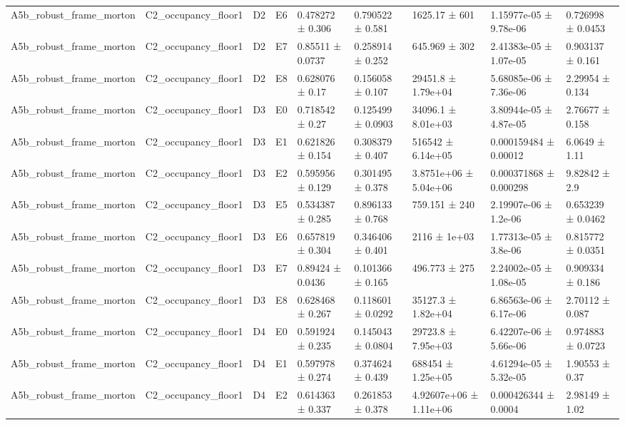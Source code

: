\begin{table}
\begin{tabular}{lllllllll}
A5b\_robust\_frame\_morton & C2\_occupancy\_floor1 & D2 & E6 & 0.478272 ± 0.306 & 0.790522 ± 0.581 & 1625.17 ± 601 & 1.15977e-05 ± 9.78e-06 & 0.726998 ± 0.0453 \\
A5b\_robust\_frame\_morton & C2\_occupancy\_floor1 & D2 & E7 & 0.85511 ± 0.0737 & 0.258914 ± 0.252 & 645.969 ± 302 & 2.41383e-05 ± 1.07e-05 & 0.903137 ± 0.161 \\
A5b\_robust\_frame\_morton & C2\_occupancy\_floor1 & D2 & E8 & 0.628076 ± 0.17 & 0.156058 ± 0.107 & 29451.8 ± 1.79e+04 & 5.68085e-06 ± 7.36e-06 & 2.29954 ± 0.134 \\
A5b\_robust\_frame\_morton & C2\_occupancy\_floor1 & D3 & E0 & 0.718542 ± 0.27 & 0.125499 ± 0.0903 & 34096.1 ± 8.01e+03 & 3.80944e-05 ± 4.87e-05 & 2.76677 ± 0.158 \\
A5b\_robust\_frame\_morton & C2\_occupancy\_floor1 & D3 & E1 & 0.621826 ± 0.154 & 0.308379 ± 0.407 & 516542 ± 6.14e+05 & 0.000159484 ± 0.00012 & 6.0649 ± 1.11 \\
A5b\_robust\_frame\_morton & C2\_occupancy\_floor1 & D3 & E2 & 0.595956 ± 0.129 & 0.301495 ± 0.378 & 3.8751e+06 ± 5.04e+06 & 0.000371868 ± 0.000298 & 9.82842 ± 2.9 \\
A5b\_robust\_frame\_morton & C2\_occupancy\_floor1 & D3 & E5 & 0.534387 ± 0.285 & 0.896133 ± 0.768 & 759.151 ± 240 & 2.19907e-06 ± 1.2e-06 & 0.653239 ± 0.0462 \\
A5b\_robust\_frame\_morton & C2\_occupancy\_floor1 & D3 & E6 & 0.657819 ± 0.304 & 0.346406 ± 0.401 & 2116 ± 1e+03 & 1.77313e-05 ± 3.8e-06 & 0.815772 ± 0.0351 \\
A5b\_robust\_frame\_morton & C2\_occupancy\_floor1 & D3 & E7 & 0.89424 ± 0.0436 & 0.101366 ± 0.165 & 496.773 ± 275 & 2.24002e-05 ± 1.08e-05 & 0.909334 ± 0.186 \\
A5b\_robust\_frame\_morton & C2\_occupancy\_floor1 & D3 & E8 & 0.628468 ± 0.267 & 0.118601 ± 0.0292 & 35127.3 ± 1.82e+04 & 6.86563e-06 ± 6.17e-06 & 2.70112 ± 0.087 \\
A5b\_robust\_frame\_morton & C2\_occupancy\_floor1 & D4 & E0 & 0.591924 ± 0.235 & 0.145043 ± 0.0804 & 29723.8 ± 7.95e+03 & 6.42207e-06 ± 5.66e-06 & 0.974883 ± 0.0723 \\
A5b\_robust\_frame\_morton & C2\_occupancy\_floor1 & D4 & E1 & 0.597978 ± 0.274 & 0.374624 ± 0.439 & 688454 ± 1.25e+05 & 4.61294e-05 ± 5.32e-05 & 1.90553 ± 0.37 \\
A5b\_robust\_frame\_morton & C2\_occupancy\_floor1 & D4 & E2 & 0.614363 ± 0.337 & 0.261853 ± 0.378 & 4.92607e+06 ± 1.11e+06 & 0.000426344 ± 0.0004 & 2.98149 ± 1.02 \\

\end{tabular}
\end{table}
